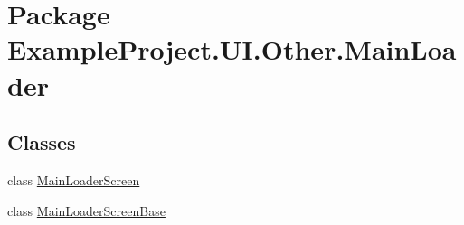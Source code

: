 \hypertarget{namespace_example_project_1_1_u_i_1_1_other_1_1_main_loader}{}\section{Package Example\+Project.\+U\+I.\+Other.\+Main\+Loader}
\label{namespace_example_project_1_1_u_i_1_1_other_1_1_main_loader}
\subsection*{Classes}
\begin{DoxyCompactItemize}
\item 
class \hyperlink{class_example_project_1_1_u_i_1_1_other_1_1_main_loader_1_1_main_loader_screen}{Main\+Loader\+Screen}
\item 
class \hyperlink{class_example_project_1_1_u_i_1_1_other_1_1_main_loader_1_1_main_loader_screen_base}{Main\+Loader\+Screen\+Base}
\end{DoxyCompactItemize}
